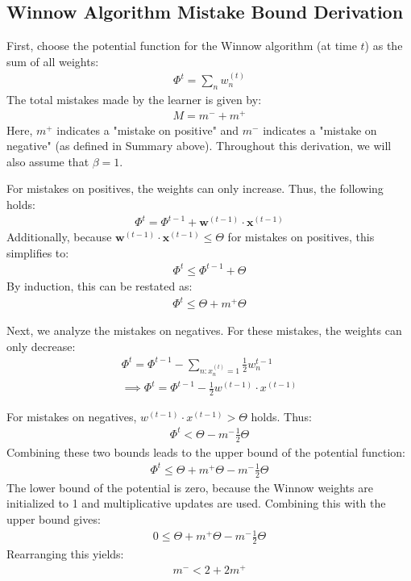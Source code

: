 \documentclass[11pt]{article}
\begin{document}



\subsection{Winnow Algorithm Mistake Bound Derivation}
First, choose the potential function for the Winnow algorithm (at time $t$) as the sum of all weights:
\begin{align}
    \Phi^t = \sum_n w_n^{(t)}
\end{align}
The total mistakes made by the learner is given by:
\begin{align}
    M = m^- + m^+
\end{align}
Here, $m^+$ indicates a "mistake on positive" and $m^-$ indicates a "mistake on negative" (as defined in Summary above).
Throughout this derivation, we will also assume that $\beta=1$. 

For mistakes on positives, the weights can only increase. Thus, the following holds:
\begin{align}
    \Phi^t = \Phi^{t-1} + \boldsymbol{w}^{(t-1)} \cdot \boldsymbol{x}^{(t-1)}
\end{align}
Additionally, because $\boldsymbol{w}^{(t-1)} \cdot \boldsymbol{x}^{(t-1)} \leq \Theta$ for mistakes on positives, this simplifies to:
\begin{align}
    \Phi^t \leq \Phi^{t-1} + \Theta
\end{align}
By induction, this can be restated as:
\begin{align}
    \Phi^t \leq \Theta + m^+ \Theta
\end{align}

Next, we analyze the mistakes on negatives. For these mistakes, the weights can only decrease:
\begin{align}
    \Phi^t = \Phi^{t-1} - \sum_{n: x_n^{(t)} = 1} \frac{1}{2}w_n^{t-1} \\
    \implies \Phi^t = \Phi^{t-1} - \frac{1}{2}w^{(t-1)} \cdot x^{(t-1)}
\end{align}

For mistakes on negatives, $w^{(t-1)} \cdot x^{(t-1)} > \Theta$ holds. Thus:
\begin{align}
    \Phi^t < \Theta - m^- \frac{1}{2} \Theta
\end{align}
Combining these two bounds leads to the upper bound of the potential function:
\begin{align}
    \Phi^t \leq \Theta + m^+ \Theta - m^- \frac{1}{2} \Theta
\end{align}
The lower bound of the potential is zero, because the Winnow weights are initialized to 1 and multiplicative updates are used. Combining this with the upper bound gives:
\begin{align}
    0 \leq \Theta + m^+ \Theta - m^- \frac{1}{2} \Theta
\end{align}
Rearranging this yields:
\begin{align}
    m^- < 2 + 2m^+
\end{align}
\end{document}
